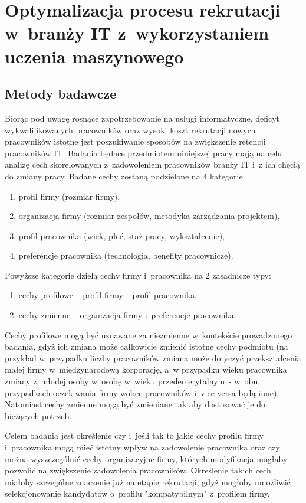 \chapter{Optymalizacja procesu rekrutacji w~branży IT z~wykorzystaniem uczenia maszynowego}\label{ch:analysis}
\section{Metody badawcze}\label{sec:analysis-method}
Biorąc pod uwagę rosnące zapotrzebowanie na usługi informatyczne, deficyt wykwalifikowanych pracowników \cite{daxx-2021} oraz wysoki koszt rekrutacji nowych pracowników \cite{hairing-dev-2021} istotne jest poszukiwanie sposobów na zwiększenie retencji pracowników IT.
Badania będące przedmiotem niniejszej pracy mają na celu analizę cech skorelowanych z~zadowoleniem pracowników branży IT i~z ich chęcią do zmiany pracy.
Badane cechy zostaną podzielone na 4 kategorie:
\begin{enumerate}
    \item profil firmy (rozmiar firmy),
    \item organizacja firmy (rozmiar zespołów, metodyka zarządzania projektem),
    \item profil pracownika (wiek, płeć, staż pracy, wykształcenie),
    \item preferencje pracownika (technologia, benefity pracownicze).
    \end{enumerate}

Powyższe kategorie dzielą cechy firmy i~pracownika na 2 zasadnicze typy:
\begin{enumerate}
    \item cechy profilowe~- profil firmy i~profil pracownika,
    \item cechy zmienne~- organizacja firmy i~preferencje pracownika.
    \end{enumerate}

Cechy profilowe mogą być uznawane za niezmienne w~kontekście prowadzonego badania, gdyż ich zmiana może całkowicie zmienić istotne cechy podmiotu
(na przykład w~przypadku liczby pracowników zmiana może dotyczyć przekształcenia małej firmy w~międzynarodową korporację, a~w przypadku wieku pracownika zmiany z~młodej osoby w~osobę w~wieku przedemerytalnym~- w~obu przypadkach oczekiwania firmy wobec pracowników i~vice versa będą inne).
Natomiast cechy zmienne mogą być zmieniane tak aby dostosować je do bieżących potrzeb.

Celem badania jest określenie czy i~jeśli tak to jakie cechy profilu firmy i~pracownika mogą mieć istotny wpływ na zadowolenie pracownika
oraz czy można wyszczególnić cechy organizacyjne firmy, których modyfikacja mogłaby pozwolić na zwiększenie zadowolenia pracowników.
Określenie takich cech miałoby szczególne znaczenie już na etapie rekrutacji, gdyż mogłoby umożliwić selekcjonowanie kandydatów o~profilu "kompatybilnym" z~profilem firmy.


